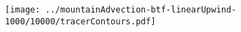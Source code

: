 \documentclass{article}
\begin{document}
\texttt{[image: ../mountainAdvection-btf-linearUpwind-1000/10000/tracerContours.pdf]}
\end{document}
